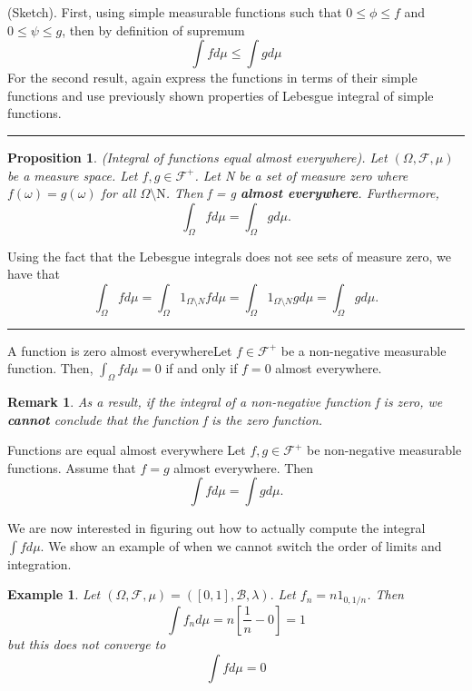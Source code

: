 \documentclass[twoside]{article}
\newtheorem{proposition}[theorem]{Proposition}
\newtheorem{remark}[theorem]{Remark}
\newtheorem{example}[theorem]{Example}
\newenvironment{proof}{{\bf Proof:}}{\hfill\rule{2mm}{2mm}}
\newcommand{\sigmalgebra}{\mathcal{F}}
\newcommand{\borelsigmaalgebra}{\mathcal{B}}
\begin{document}
\begin{proof}(Sketch). First, using simple measurable functions such that $0 \leq \phi \leq f$ and $0 \leq \psi \leq g$, then by definition of supremum 
$$
\int fd\mu \leq \int gd\mu
$$
For the second result, again express the functions in terms of their simple functions and use previously shown properties of Lebesgue integral of simple functions.
\end{proof}



\begin{proposition}(Integral of functions equal almost everywhere). Let $(\Omega, \mathcal{F}, \mu)$ be a measure space. Let $f,g \in \mathcal{F}^+$. Let N be a set of measure zero where $f(\omega) = g(\omega)$ for all $\Omega \text{\textbackslash N}$. Then f = g \textbf{almost everywhere}. Furthermore, 
$$
\int_{\Omega}fd\mu = \int_{\Omega}gd\mu.
$$
\end{proposition}

\begin{proof}
Using the fact that the Lebesgue integrals does not see sets of measure zero, we have that 
$$
\int_{\Omega}fd\mu = \int_{\Omega}1_{\Omega \text{\textbackslash} N}fd\mu = \int_{\Omega}1_{\Omega \text{\textbackslash} N}gd\mu = \int_{\Omega}gd\mu.
$$
\end{proof}

\begin{proposition_exam}{A function is zero almost everywhere}{}Let $f \in \mathcal{F}^+$ be a non-negative measurable function. Then, $\int_{\Omega}fd\mu = 0$ if and only if $f = 0$ almost everywhere.
\end{proposition_exam}
\begin{remark}
As a result, if the integral of a non-negative function f is zero, we \textbf{cannot} conclude that the function f is the zero function.
\end{remark}

\begin{proposition_exam}{Functions are equal almost everywhere}{} Let $f, g \in \sigmalgebra^+$ be non-negative measurable functions. Assume that $f = g$ almost everywhere. Then 
$$
\int fd\mu = \int gd\mu.
$$
\end{proposition_exam}


We are now interested in figuring out how to actually compute the integral $\int fd\mu.$ We show an example of when we cannot switch the order of limits and integration.

\begin{example} Let $(\Omega, \sigmalgebra, \mu) = ([0,1], \borelsigmaalgebra, \lambda).$ Let $f_n = n1_{0, 1/n}$. Then 
$$
\int f_nd\mu = n[\frac{1}{n} - 0] = 1 
$$
but this does not converge to
$$
\int fd\mu = 0
$$
\end{example}
\end{document}
